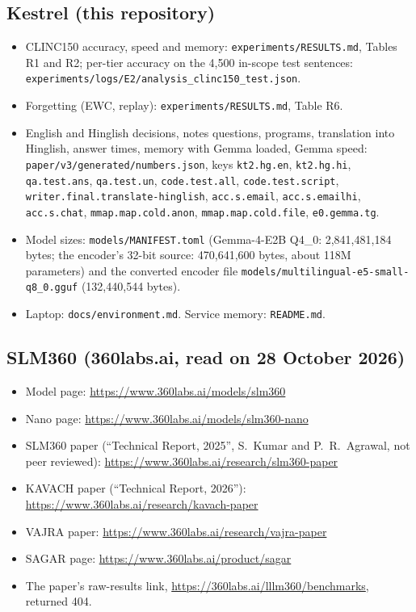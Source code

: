 \documentclass[11pt,a4paper]{article}
\begin{document}
\subsection*{Kestrel (this repository)}
\begin{itemize}[leftmargin=*]
  \item CLINC150 accuracy, speed and memory: \texttt{experiments/RESULTS.md}, Tables R1 and R2; per-tier accuracy on the
  4,500 in-scope test sentences: \texttt{experiments/logs/E2/analysis\_clinc150\_test.json}.
  \item Forgetting (EWC, replay): \texttt{experiments/RESULTS.md}, Table R6.
  \item English and Hinglish decisions, notes questions, programs, translation into Hinglish, answer times, memory with
  Gemma loaded, Gemma speed: \texttt{paper/v3/generated/numbers.json}, keys \texttt{kt2.hg.en}, \texttt{kt2.hg.hi},
  \texttt{qa.test.ans}, \texttt{qa.test.un}, \texttt{code.test.all}, \texttt{code.test.script},
  \texttt{writer.final.translate-hinglish}, \texttt{acc.s.email}, \texttt{acc.s.emailhi}, \texttt{acc.s.chat},
  \texttt{mmap.map.cold.anon}, \texttt{mmap.map.cold.file}, \texttt{e0.gemma.tg}.
  \item Model sizes: \texttt{models/MANIFEST.toml} (Gemma-4-E2B Q4\_0: 2,841,481,184 bytes; the encoder's 32-bit
  source: 470,641,600 bytes, about 118M parameters) and the converted encoder file
  \texttt{models/multilingual-e5-small-q8\_0.gguf} (132,440,544 bytes).
  \item Laptop: \texttt{docs/environment.md}. Service memory: \texttt{README.md}.
\end{itemize}

\subsection*{SLM360 (360labs.ai, read on 28 October 2026)}
\begin{itemize}[leftmargin=*]
  \item Model page: \url{https://www.360labs.ai/models/slm360}
  \item Nano page: \url{https://www.360labs.ai/models/slm360-nano}
  \item SLM360 paper (``Technical Report, 2025'', S.~Kumar and P.~R.~Agrawal, not peer reviewed):
  \url{https://www.360labs.ai/research/slm360-paper}
  \item KAVACH paper (``Technical Report, 2026''): \url{https://www.360labs.ai/research/kavach-paper}
  \item VAJRA paper: \url{https://www.360labs.ai/research/vajra-paper}
  \item SAGAR page: \url{https://www.360labs.ai/product/sagar}
  \item The paper's raw-results link, \url{https://360labs.ai/lllm360/benchmarks}, returned 404.
\end{itemize}
\end{document}
